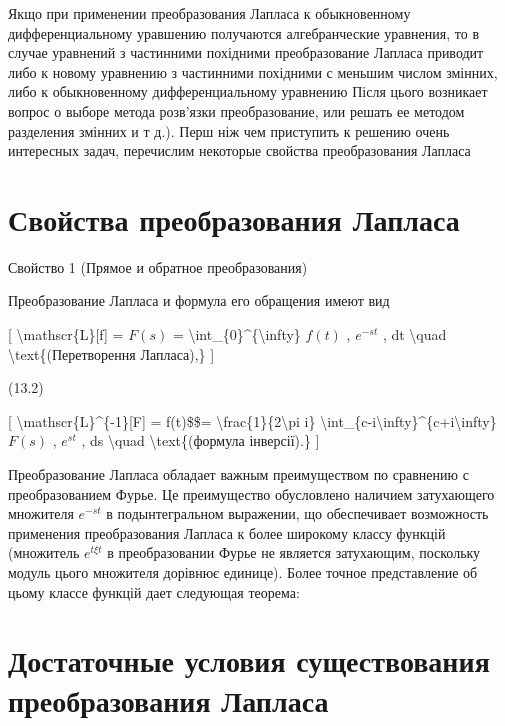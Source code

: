 \documentclass[
]{article}
\begin{document}
{{Якщо при применении преобразования Лапласа к обыкновенному
дифференциальному уравшению получаются алгебранческие уравнения, то в
случае уравнений з частинними похідними преобразование Лапласа приводит
либо к новому уравнению з частинними похідними с меньшим числом змінних,
либо к обыкновенному дифференциальному уравнению Після цього возникает
вопрос о выборе метода розв'язки преобразование, или решать ее методом
разделения змінних и т д.). Перш ніж чем приступить к решению очень
интересных задач, перечислим некоторые свойства преобразования Лапласа

\section{Свойства преобразования
Лапласа}\label{ux441ux432ux43eux439ux441ux442ux432ux430-ux43fux440ux435ux43eux431ux440ux430ux437ux43eux432ux430ux43dux438ux44f-ux43bux430ux43fux43bux430ux441ux430}

Свойство 1 (Прямое и обратное преобразования)

Преобразование Лапласа и формула его обращения имеют вид

{[} \textbackslash mathscr\{L\}{[}f{]} = \(F(s)\) =
\textbackslash int\_\{0\}\^{}\{\textbackslash infty\} \(f(t)\) ,
\(e^{-st}\) , dt \textbackslash quad \textbackslash text\{(Перетворення
Лапласа),\} {]}

(13.2)

{[} \textbackslash mathscr\{L\}\^{}\{-1\}{[}F{]} = f(t)\$\$=
\textbackslash frac\{1\}\{2\textbackslash pi i\}
\textbackslash int\_\{c-i\textbackslash infty\}\^{}\{c+i\textbackslash infty\}
\(F(s)\) , \(e^{st}\) , ds \textbackslash quad
\textbackslash text\{(формула інверсії).\} {]}

Преобразование Лапласа обладает важным преимуществом по сравнению с
преобразованием Фурье. Це преимущество обусловлено наличием затухающего
множителя \(e^{-st}\) в подынтегральном выражении, що обеспечивает
возможность применения преобразования Лапласа к более широкому классу
функцій (множитель \(e^{t\xi t}\) в преобразовании Фурье не является
затухающим, поскольку модуль цього множителя дорівнює единице). Более
точное представление об цьому классе функцій дает следующая теорема:

\section{Достаточные условия существования преобразования
Лапласа}\label{ux434ux43eux441ux442ux430ux442ux43eux447ux43dux44bux435-ux443ux441ux43bux43eux432ux438ux44f-ux441ux443ux449ux435ux441ux442ux432ux43eux432ux430ux43dux438ux44f-ux43fux440ux435ux43eux431ux440ux430ux437ux43eux432ux430ux43dux438ux44f-ux43bux430ux43fux43bux430ux441ux430}

}}
\end{document}
